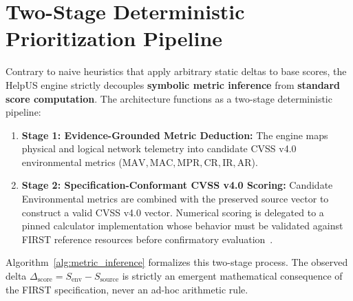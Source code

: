 \section{Two-Stage Deterministic Prioritization Pipeline}
\label{sec:two_stage_pipeline}
Contrary to naive heuristics that apply arbitrary static deltas to base scores, the HelpUS engine strictly decouples \textbf{symbolic metric inference} from \textbf{standard score computation}. The architecture functions as a two-stage deterministic pipeline:
\begin{enumerate}
    \item \textbf{Stage 1: Evidence-Grounded Metric Deduction:} The engine maps physical and logical network telemetry into candidate CVSS v4.0 environmental metrics ($\text{MAV}, \text{MAC}, \text{MPR}, \text{CR}, \text{IR}, \text{AR}$).
    \item \textbf{Stage 2: Specification-Conformant CVSS v4.0 Scoring:} Candidate Environmental metrics are combined with the preserved source vector to construct a valid CVSS v4.0 vector. Numerical scoring is delegated to a pinned calculator implementation whose behavior must be validated against FIRST reference resources before confirmatory evaluation~\cite{first_cvss_v4}.
\end{enumerate}

Algorithm~\ref{alg:metric_inference} formalizes this two-stage process. The observed delta $\Delta_{\text{score}} = S_{\text{env}} - S_{\text{source}}$ is strictly an emergent mathematical consequence of the FIRST specification, never an ad-hoc arithmetic rule.

